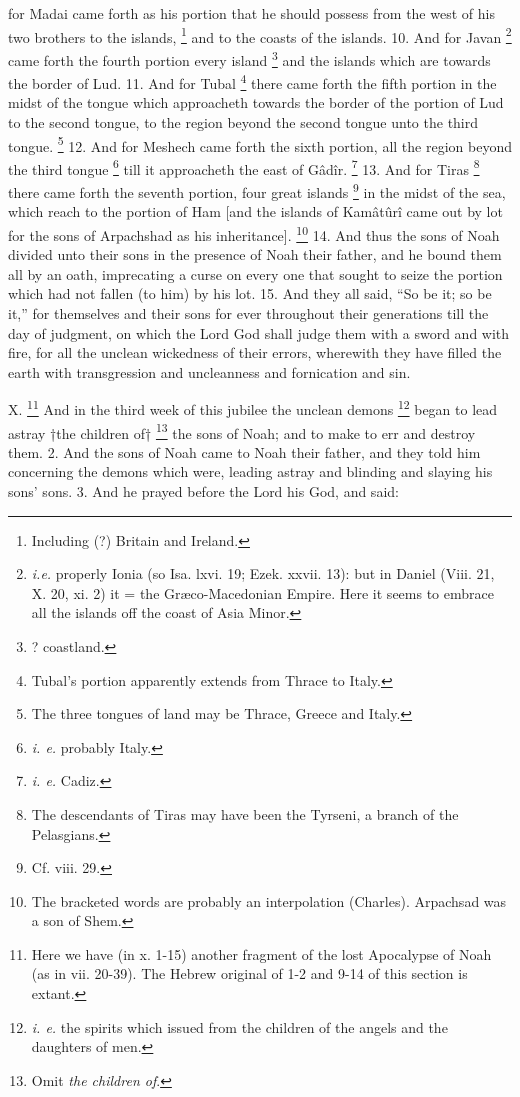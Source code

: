 for Madai came forth as his portion that he should possess from the west of his two brothers to the islands, \footnote{Including (?) Britain and Ireland.} and to the coasts of the islands. 10. And for Javan \footnote{\emph{i.e.} properly Ionia (so Isa. lxvi. 19; Ezek. xxvii. 13): but in Daniel (Viii. 21, X. 20, xi. 2) it = the Græco-Macedonian Empire. Here it seems to embrace all the islands off the coast of Asia Minor.} came forth the fourth portion every island \footnote{? coastland.} and the islands which are towards the border of Lud. 11. And for Tubal \footnote{Tubal's portion apparently extends from Thrace to Italy.} there came forth the fifth portion in the midst of the tongue which approacheth towards the border of the portion of Lud to the second tongue, to the region beyond the second tongue unto the third tongue. \footnote{The three tongues of land may be Thrace, Greece and Italy.} 12. And for Meshech came forth the sixth portion, all the region beyond the third tongue \footnote{\emph{i. e.} probably Italy.} till it approacheth the east of Gâdîr. \footnote{\emph{i. e.} Cadiz.} 13. And for Tiras \footnote{The descendants of Tiras may have been the Tyrseni, a branch of the Pelasgians.} there came forth the seventh portion, four great islands \footnote{Cf. viii. 29.} in the midst of the sea, which reach to the portion of Ham [and the islands of Kamâtûrî came out by lot for the sons of Arpachshad as his inheritance]. \footnote{The bracketed words are probably an interpolation (Charles). Arpachsad was a son of Shem.} 14. And thus the sons of Noah divided unto their sons in the presence of Noah their father, and he bound them all by an oath, imprecating a curse on every one that sought to seize the portion which had not fallen (to him) by his lot. 15. And they all said, ``So be it; so be it,'' for themselves and their sons for ever throughout their generations till the day of judgment, on which the Lord God shall judge them with a sword and with fire, for all the unclean wickedness of their errors, wherewith they have filled the earth with transgression and uncleanness and fornication and sin.


X. \footnote{Here we have (in x. 1-15) another fragment of the lost Apocalypse of Noah (as in vii. 20-39). The Hebrew original of 1-2 and 9-14 of this section is extant.} And in the third week of this jubilee the unclean demons \footnote{\emph{i. e.} the spirits which issued from the children of the angels and the daughters of men.} began to lead astray †the children of† \footnote{Omit \emph{the children of}.} the sons of Noah; and to make to err and destroy them. 2. And the sons of Noah came to Noah their father, and they told him concerning the demons which were, leading astray and blinding and slaying his sons' sons. 3. And he prayed before the Lord his God, and said:

